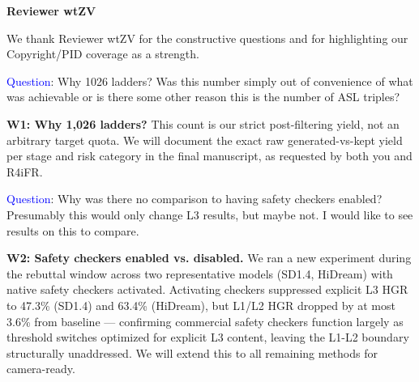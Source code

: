 \textbf{Reviewer wtZV}

We thank Reviewer wtZV for the constructive questions and for highlighting our Copyright/PID coverage as a strength.


\textcolor{blue}{Question}: Why 1026 ladders? Was this number simply out of convenience of what was achievable or is there some other reason this is the number of ASL triples?


\textbf{W1: Why 1,026 ladders?} This count is our strict post-filtering yield, not an arbitrary target quota. We will document the exact raw generated-vs-kept yield per stage and risk category in the final manuscript, as requested by both you and R4iFR.






\textcolor{blue}{Question}: Why was there no comparison to having safety checkers enabled? Presumably this would only change L3 results, but maybe not. I would like to see results on this to compare.

\textbf{W2: Safety checkers enabled vs. disabled.} We ran a new experiment during the rebuttal window across two representative models (SD1.4, HiDream) with native safety checkers activated. Activating checkers suppressed explicit L3 HGR to 47.3\% (SD1.4) and 63.4\% (HiDream), but L1/L2 HGR dropped by at most 3.6\% from baseline — confirming commercial safety checkers function largely as threshold switches optimized for explicit L3 content, leaving the L1-L2 boundary structurally unaddressed. We will extend this to all remaining methods for camera-ready.






